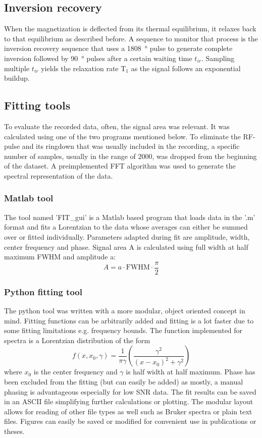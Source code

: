         \subsection{Inversion recovery}
            When the magnetization is deflected from its thermal equilibrium, it relaxes back to that equilibrium as described before. A sequence to monitor that process is the inversion recovery sequence that uses a \SI{1808}{\degree} pulse to generate complete inversion followed by \SI{90}{\degree} pulses after a certain waiting time $t_{ir}$. Sampling multiple $t_{ir}$ yields the relaxation rate T$_1$ as the signal follows an exponential buildup.
        \subsection{Fitting tools}
        To evaluate the recorded data, often, the signal area was relevant. It was calculated using one of the two programs mentioned below. To eliminate the RF-pulse and its ringdown that was usually included in the recording, a specific number of samples, usually in the range of 2000, was dropped from the beginning of the dataset. A preimplemented FFT algorithm was used to generate the spectral representation of the data.
            \subsubsection{Matlab tool}
            The tool named 'FIT\_gui' is a Matlab based program that loads data in the '.m' format and fits a Lorentzian to the data whose averages can either be summed over or fitted individually. Parameters adapted during fit are amplitude, width, center frequency and phase. Signal area A is calculated using full width at half maximum FWHM and amplitude a:
            \begin{equation}
                A=a\cdot\mathrm{FWHM}\cdot\frac{\pi}{2}
            \end{equation}
            \subsubsection{Python fitting tool}
            The python tool was written with a more modular, object oriented concept in mind. Fitting functions can be arbitrarily added and fitting is a lot faster due to some fitting limitations e.g. frequency bounds. The function implemented for spectra is a Lorentzian distribution of the form
            \begin{equation}
                f(x,x_0, \gamma) = \frac{1}{\pi\gamma}\left(\frac{\gamma^2}{(x-x_0)^2+\gamma^2}\right)
            \end{equation}
            where $x_0$ is the center frequency and $\gamma$ is half width at half maximum.
            Phase has been excluded from the fitting (but can easily be added) as mostly, a manual phasing is advantageous especially for low SNR data. The fit results can be saved in an ASCII file simplifying further calculations or plotting.
            The modular layout allows for reading of other file types as well such as Bruker spectra or plain text files.
            Figures can easily be saved or modified for convenient use in publications or theses.
